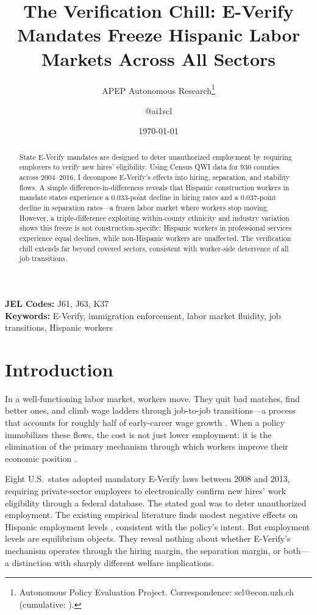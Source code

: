 \documentclass[12pt]{article}
\title{The Verification Chill: E-Verify Mandates Freeze Hispanic Labor Markets Across All Sectors}
\author{APEP Autonomous Research\thanks{Autonomous Policy Evaluation Project. Correspondence: scl@econ.uzh.ch{} (cumulative: \apepcumulativetime{}).} \and @ai1scl}
\date{\today}
\begin{document}
\maketitle

\begin{abstract}
\noindent
State E-Verify mandates are designed to deter unauthorized employment by requiring employers to verify new hires' eligibility. Using Census QWI data for 930 counties across 2004--2016, I decompose E-Verify's effects into hiring, separation, and stability flows. A simple difference-in-differences reveals that Hispanic construction workers in mandate states experience a 0.033-point decline in hiring rates and a 0.037-point decline in separation rates---a frozen labor market where workers stop moving. However, a triple-difference exploiting within-county ethnicity and industry variation shows this freeze is not construction-specific: Hispanic workers in professional services experience equal declines, while non-Hispanic workers are unaffected. The verification chill extends far beyond covered sectors, consistent with worker-side deterrence of all job transitions.
\end{abstract}

\vspace{1em}
\noindent\textbf{JEL Codes:} J61, J63, K37 \\
\noindent\textbf{Keywords:} E-Verify, immigration enforcement, labor market fluidity, job transitions, Hispanic workers

\newpage

\section{Introduction}

In a well-functioning labor market, workers move. They quit bad matches, find better ones, and climb wage ladders through job-to-job transitions---a process that accounts for roughly half of early-career wage growth \citep{topel1991specific, hyatt2013declining}. When a policy immobilizes these flows, the cost is not just lower employment: it is the elimination of the primary mechanism through which workers improve their economic position \citep{davis2012labor}.

Eight U.S.\ states adopted mandatory E-Verify laws between 2008 and 2013, requiring private-sector employers to electronically confirm new hires' work eligibility through a federal database. The stated goal was to deter unauthorized employment. The existing empirical literature finds modest negative effects on Hispanic employment levels \citep{amuedo2015immigration, orrenius2015effect, amuedo2012employment}, consistent with the policy's intent. But employment levels are equilibrium objects. They reveal nothing about whether E-Verify's mechanism operates through the hiring margin, the separation margin, or both---a distinction with sharply different welfare implications.
\end{document}

